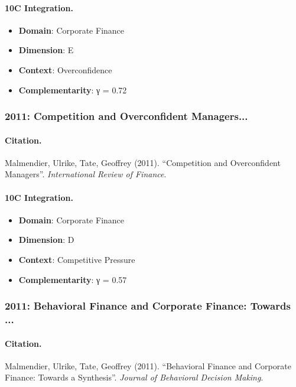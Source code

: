 \paragraph{10C Integration.}
\begin{itemize}[nosep]
  \item \textbf{Domain}: Corporate Finance
  \item \textbf{Dimension}: E
  \item \textbf{Context}: Overconfidence
  \item \textbf{Complementarity}: γ = 0.72
\end{itemize}


\subsubsection{2011: Competition and Overconfident Managers...}

\paragraph{Citation.}
Malmendier, Ulrike, Tate, Geoffrey (2011). ``Competition and Overconfident Managers''. \textit{International Review of Finance}.

\paragraph{10C Integration.}
\begin{itemize}[nosep]
  \item \textbf{Domain}: Corporate Finance
  \item \textbf{Dimension}: D
  \item \textbf{Context}: Competitive Pressure
  \item \textbf{Complementarity}: γ = 0.57
\end{itemize}


\subsubsection{2011: Behavioral Finance and Corporate Finance: Towards ...}

\paragraph{Citation.}
Malmendier, Ulrike, Tate, Geoffrey (2011). ``Behavioral Finance and Corporate Finance: Towards a Synthesis''. \textit{Journal of Behavioral Decision Making}.

